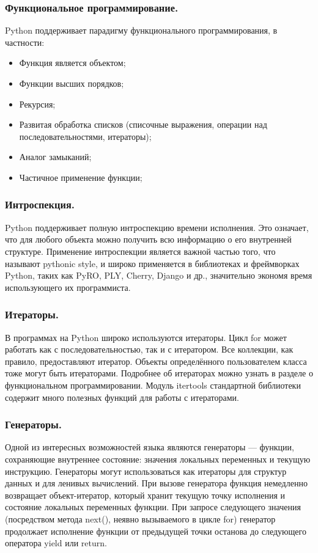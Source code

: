 \subsubsection{Функциональное программирование. }
Python поддерживает парадигму функционального программирования, в частности:
\begin{itemize}
\item Функция является объектом;
\item Функции высших порядков;
\item Рекурсия;
\item Развитая обработка списков (списочные выражения, операции над последовательностями, итераторы);
\item Аналог замыканий;
\item Частичное применение функции;
\end{itemize}

\subsubsection{Интроспекция. }
Python поддерживает полную интроспекцию времени исполнения. Это означает, что для любого объекта можно получить всю информацию о его внутренней структуре.
Применение интроспекции является важной частью того, что называют pythonic style, и широко применяется в библиотеках и фреймворках Python, таких как PyRO, PLY, Cherry, Django и др., значительно экономя время использующего их программиста.

\subsubsection{Итераторы. }
В программах на Python широко используются итераторы. Цикл for может работать как с последовательностью, так и с итератором. Все коллекции, как правило, предоставляют итератор. Объекты определённого пользователем класса тоже могут быть итераторами. Подробнее об итераторах можно узнать в разделе о функциональном программировании. Модуль itertools стандартной библиотеки содержит много полезных функций для работы с итераторами.

\subsubsection{Генераторы. }
Одной из интересных возможностей языка являются генераторы — функции, сохраняющие внутреннее состояние: значения локальных переменных и текущую инструкцию. Генераторы могут использоваться как итераторы для структур данных и для ленивых вычислений.
При вызове генератора функция немедленно возвращает объект-итератор, который хранит текущую точку исполнения и состояние локальных переменных функции. При запросе следующего значения (посредством метода next(), неявно вызываемого в цикле for) генератор продолжает исполнение функции от предыдущей точки останова до следующего оператора yield или return.

